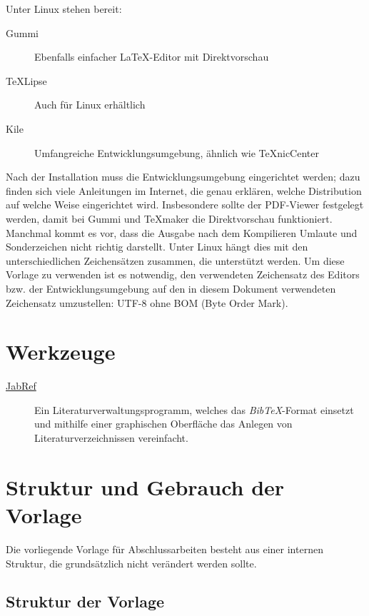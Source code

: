 Unter Linux stehen bereit:

\begin{description}
	\item [Gummi] Ebenfalls einfacher LaTeX-Editor mit Direktvorschau
	\item [TeXLipse] Auch für Linux erhältlich
	\item [Kile] Umfangreiche Entwicklungsumgebung, ähnlich wie TeXnicCenter
\end{description}

Nach der Installation muss die Entwicklungsumgebung eingerichtet werden; dazu finden sich viele Anleitungen im Internet, die genau erklären, welche Distribution
auf welche Weise eingerichtet wird. Insbesondere sollte der PDF-Viewer festgelegt werden, damit bei Gummi und TeXmaker die Direktvorschau funktioniert. Manchmal kommt es vor, dass die Ausgabe 
nach dem Kompilieren Umlaute und Sonderzeichen nicht richtig darstellt. Unter Linux hängt dies mit den unterschiedlichen Zeichensätzen zusammen, die unterstützt
werden. Um diese Vorlage zu verwenden ist es notwendig, den verwendeten Zeichensatz des Editors bzw. der Entwicklungsumgebung auf den in diesem Dokument
verwendeten Zeichensatz umzustellen: UTF-8 ohne BOM (Byte Order Mark).

\section{Werkzeuge}
\label{sec:Werkzeuge}

\begin{description}
	\item [\href{http://jabref.sourceforge.net/}{JabRef}] Ein Literaturverwaltungsprogramm, welches das \textit{BibTeX}-Format einsetzt
	und mithilfe einer graphischen Oberfläche das Anlegen von Literaturverzeichnissen vereinfacht.
	
\end{description}

\section{Struktur und Gebrauch der Vorlage}

Die vorliegende Vorlage für Abschlussarbeiten besteht aus einer internen Struktur, die grundsätzlich nicht verändert werden sollte. %

\subsection{Struktur der Vorlage}
\label{subsec:strukturvorlage}

